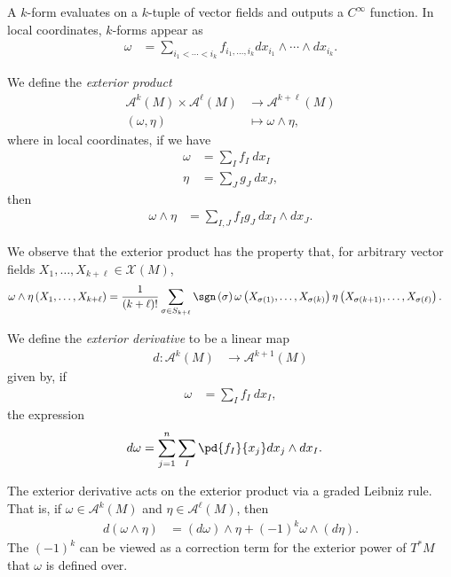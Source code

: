\documentclass[10pt]{mypackage}
\begin{document}
A $k$-form evaluates on a $k$-tuple of vector fields and outputs a $C^{\infty}$ function. In local coordinates, $k$-forms appear as
\begin{align*}
  \omega &= \sum_{i_1 < \cdots < i_k} f_{i_1,\dots,i_k} dx_{i_1}\wedge\cdots\wedge dx_{i_k}.
\end{align*}
\begin{definition}
  We define the \textit{exterior product}
  \begin{align*}
    \mathcal{A}^{k}\left( M \right)\times \mathcal{A}^{\ell}\left( M \right) &\rightarrow \mathcal{A}^{k + \ell}\left( M \right)\\
    \left( \omega,\eta \right) &\mapsto \omega\wedge \eta,
  \end{align*}
  where in local coordinates, if we have
  \begin{align*}
    \omega &= \sum_{I}f_I\:dx_I\\
    \eta &= \sum_{J}g_J\:dx_J,
  \end{align*}
  then
  \begin{align*}
    \omega\wedge\eta &= \sum_{I,J}f_Ig_J\:dx_I\wedge dx_J.
  \end{align*}
\end{definition}
We observe that the exterior product has the property that, for arbitrary vector fields $X_1,\dots,X_{k + \ell}\in \mathcal{X}\left( M \right)$,
\begin{align*}
  \omega\wedge \eta\left( X_1,\dots,X_{k + \ell} \right) &= \frac{1}{\left( k+\ell \right)!} \sum_{\sigma\in S_{k + \ell}} \sgn\left( \sigma \right)\omega\left( X_{\sigma(1)},\dots,X_{\sigma(k)} \right) \eta\left( X_{\sigma(k+1)},\dots,X_{\sigma(\ell)} \right).
\end{align*}
\begin{definition}
  We define the \textit{exterior derivative} to be a linear map
  \begin{align*}
    d\colon \mathcal{A}^{k}\left( M \right)&\rightarrow \mathcal{A}^{k+1}\left( M \right)
  \end{align*}
  given by, if
  \begin{align*}
    \omega &= \sum_{I}f_I\:dx_I,
  \end{align*}
  the expression
  \begin{align*}
    d\omega &= \sum_{j=1}^{n}\sum_{I} \pd{f_I}{x_j}dx_j\wedge dx_I.
  \end{align*}
\end{definition}
\begin{proposition}
  The exterior derivative acts on the exterior product via a graded Leibniz rule. That is, if $\omega\in \mathcal{A}^{k}\left( M \right)$ and $\eta\in \mathcal{A}^{\ell}\left( M \right)$, then
  \begin{align*}
    d\left( \omega\wedge\eta \right) &= \left( d\omega \right)\wedge \eta + \left( -1 \right)^{k} \omega \wedge \left( d\eta \right).
  \end{align*}
  The $\left( -1 \right)^{k}$ can be viewed as a correction term for the exterior power of $T^{\ast}M$ that $\omega$ is defined over.
\end{proposition}
\end{document}
